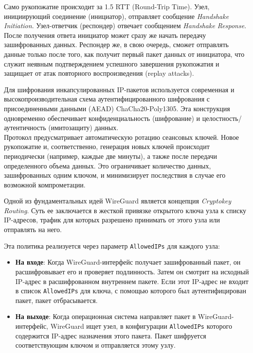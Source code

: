 Само рукопожатие происходит за 1.5 RTT (Round-Trip Time).
Узел, инициирующий соединение (инициатор), отправляет сообщение \textit{Handshake Initiation}.
Узел-ответчик (респондер) отвечает сообщением \textit{Handshake Response}.
После получения ответа инициатор может сразу же начать передачу зашифрованных данных. Респондер же, в свою очередь, сможет отправлять данные только после того, как получит первый пакет данных от инициатора, что служит неявным подтверждением успешного завершения рукопожатия и защищает от атак повторного воспроизведения (replay attacks).

Для шифрования инкапсулированных IP-пакетов используется современная и высокопроизводительная схема аутентифицированного шифрования с присоединенными данными (AEAD) ChaCha20-Poly1305.
Эта конструкция одновременно обеспечивает конфиденциальность (шифрование) и целостность/аутентичность (имитозащиту) данных.\\

Протокол предусматривает автоматическую ротацию сеансовых ключей.
Новое рукопожатие и, соответственно, генерация новых ключей происходит периодически (например, каждые две минуты), а также после передачи определенного объема данных.
Это ограничивает количество данных, зашифрованных одним ключом, и минимизирует последствия в случае его возможной компрометации.

Одной из фундаментальных идей WireGuard является концепция \textit{Cryptokey Routing}.
Суть ее заключается в жесткой привязке открытого ключа узла к списку IP-адресов, трафик для которых разрешено принимать от этого узла или отправлять на него.

Эта политика реализуется через параметр \texttt{AllowedIPs} для каждого узла:
\begin{itemize}
    \item \textbf{На входе}: Когда WireGuard-интерфейс получает зашифрованный пакет, он расшифровывает его и проверяет подлинность.
    Затем он смотрит на исходный IP-адрес в расшифрованном внутреннем пакете.
    Если этот IP-адрес не входит в список \texttt{AllowedIPs} для ключа, с помощью которого был аутентифицирован пакет, пакет отбрасывается.
    \item \textbf{На выходе}: Когда операционная система направляет пакет в WireGuard-интерфейс, WireGuard ищет узел, в конфигурации \texttt{AllowedIPs} которого содержится IP-адрес назначения этого пакета.
    Пакет шифруется соответствующим ключом и отправляется этому узлу.
\end{itemize}

